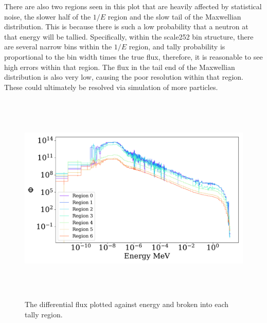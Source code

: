 There are also two regions seen in this plot that are heavily affected by statistical noise, the slower half of the $1/E$ region and the slow tail of the Maxwellian distribution.
This is because there is such a low probability that a neutron at that energy will be tallied.
Specifically, within the scale252 bin structure, there are several narrow bins within the $1/E$ region, and tally probability is proportional to the bin width times the true flux, therefore, it is reasonable to see high errors within that region.
The flux in the tail end of the Maxwellian distribution is also very low, causing the poor resolution within that region.
These could ultimately be resolved via simulation of more particles.



%
\begin{figure}[htb]
\centering
\includegraphics[height=4in]{tex/figures/flux_rad_erg.pdf}
\caption[Regional Flux vs. Energy]{The differential flux plotted against energy and broken into each tally region.}
\label{fig:flux_rad_erg}
\end{figure}

